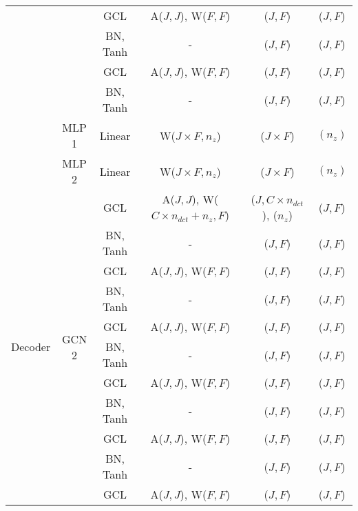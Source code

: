 \documentclass[sigconf,screen,nonacm]{acmart}
\begin{document}
\begin{table}[!t]
{\begin{tabular}{c|c|c|c|c|c}
				&                         & GCL      & A($J, J$), W($F, F$)   & ($J, F$)      & ($J, F$)    \\ \cline{3-6}
				&                         & BN, Tanh &  -                     & ($J, F$)      & ($J, F$)    \\ \cline{3-6}
				&                         & GCL      & A($J, J$), W($F, F$)   & ($J, F$)      & ($J, F$)    \\ \cline{3-6}
				&                         & BN, Tanh & -                    & ($J, F$)      & ($J, F$)    \\ \cline{2-6} 
				& MLP 1                   & Linear & W($J \times F, n_z$)             & ($J \times F$)       & $(n_z)$         \\ \cline{3-6} \cline{2-6} 
				& MLP 2                   & Linear & W($J \times F, n_z$)             & ($J \times F$)       & $(n_z)$         \\ \hline
				\multirow{19}{*}{Decoder} & \multirow{19}{*}{GCN 2} & GCL      & A($J, J$), W($C \times n_{dct} + n_z,  F$) & ($J, C \times n_{dct}$), ($n_z$) & ($J, F$)    \\ \cline{3-6}
				&                         & BN, Tanh &  -                     & ($J, F$)      & ($J, F$)    \\ \cline{3-6}
				&                         & GCL      & A($J, J$), W($F, F$)   & ($J, F$)      & ($J, F$)    \\ \cline{3-6}
				&                         & BN, Tanh &  -                    & ($J, F$)      & ($J, F$)    \\ \cline{3-6}
				&                         & GCL      & A($J, J$), W($F, F$)   & ($J, F$)      & ($J, F$)    \\ \cline{3-6}
				&                         & BN, Tanh &  -                     & ($J, F$)      & ($J, F$)    \\ \cline{3-6}
				&                         & GCL      & A($J, J$), W($F, F$)   & ($J, F$)      & ($J, F$)    \\ \cline{3-6}
				&                         & BN, Tanh &  -                    & ($J, F$)      & ($J, F$)    \\ \cline{3-6}
				&                         & GCL      & A($J, J$), W($F, F$)   & ($J, F$)      & ($J, F$)    \\ \cline{3-6}
				&                         & BN, Tanh &  -                     & ($J, F$)      & ($J, F$)    \\ \cline{3-6}
				&                         & GCL      & A($J, J$), W($F, F$)   & ($J, F$)      & ($J, F$)    \\ \cline{3-6}

\end{tabular}}
\end{table}
\end{document}

